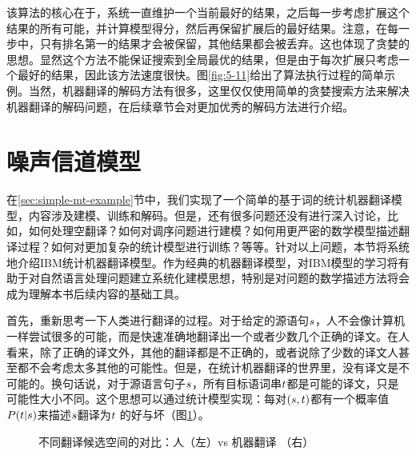 \parinterval 该算法的核心在于，系统一直维护一个当前最好的结果，之后每一步考虑扩展这个结果的所有可能，并计算模型得分，然后再保留扩展后的最好结果。注意，在每一步中，只有排名第一的结果才会被保留，其他结果都会被丢弃。这也体现了贪婪的思想。显然这个方法不能保证搜索到全局最优的结果，但是由于每次扩展只考虑一个最好的结果，因此该方法速度很快。图\ref{fig:5-11}给出了算法执行过程的简单示例。当然，机器翻译的解码方法有很多，这里仅仅使用简单的贪婪搜索方法来解决机器翻译的解码问题，在后续章节会对更加优秀的解码方法进行介绍。


\section{噪声信道模型}

\vspace{0.5em}

\parinterval 在\ref{sec:simple-mt-example}节中，我们实现了一个简单的基于词的统计机器翻译模型，内容涉及建模、训练和解码。但是，还有很多问题还没有进行深入讨论，比如，如何处理空翻译？如何对调序问题进行建模？如何用更严密的数学模型描述翻译过程？如何对更加复杂的统计模型进行训练？等等。针对以上问题，本节将系统地介绍IBM统计机器翻译模型。作为经典的机器翻译模型，对IBM模型的学习将有助于对自然语言处理问题建立系统化建模思想，特别是对问题的数学描述方法将会成为理解本书后续内容的基础工具。

\parinterval 首先，重新思考一下人类进行翻译的过程。对于给定的源语句${s}$，人不会像计算机一样尝试很多的可能，而是快速准确地翻译出一个或者少数几个正确的译文。在人看来，除了正确的译文外，其他的翻译都是不正确的，或者说除了少数的译文人甚至都不会考虑太多其他的可能性。但是，在统计机器翻译的世界里，没有译文是不可能的。换句话说，对于源语言句子${s}$，所有目标语词串${t}$都是可能的译文，只是可能性大小不同。这个思想可以通过统计模型实现：每对$({s},{t})$都有一个概率值${P}({t}|{s})$来描述${s}$翻译为${t}$ 的好与坏（图\ref{fig:5-12}）。

\begin{figure}[htp]
    \centering

\caption{不同翻译候选空间的对比：人（左）vs 机器翻译 （右）}
    \label{fig:5-12}
\end{figure}

